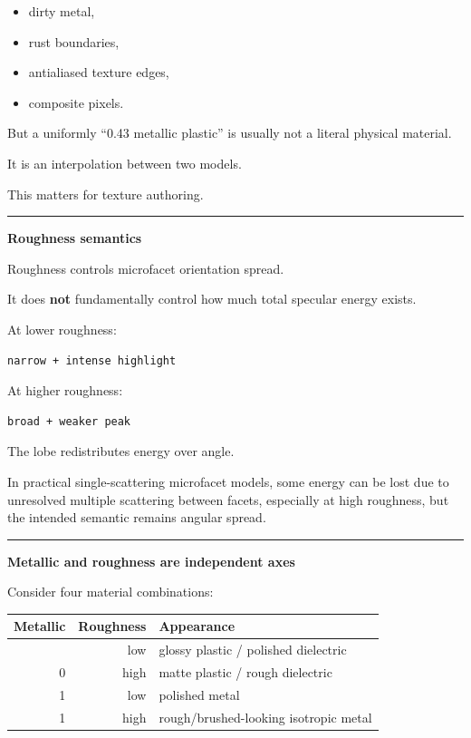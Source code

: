 \begin{itemize}
\tightlist
\item
  dirty metal,
\item
  rust boundaries,
\item
  antialiased texture edges,
\item
  composite pixels.
\end{itemize}

But a uniformly ``0.43 metallic plastic'' is usually not a literal physical material.

It is an interpolation between two models.

This matters for texture authoring.

\begin{center}\rule{0.5\linewidth}{0.5pt}\end{center}

\textbf{Roughness semantics}

Roughness controls microfacet orientation spread.

It does \textbf{not} fundamentally control how much total specular energy exists.

At lower roughness:

\begin{verbatim}
narrow + intense highlight
\end{verbatim}

At higher roughness:

\begin{verbatim}
broad + weaker peak
\end{verbatim}

The lobe redistributes energy over angle.

In practical single-scattering microfacet models, some energy can be lost due to unresolved multiple scattering between facets, especially at high roughness, but the intended semantic remains angular spread.

\begin{center}\rule{0.5\linewidth}{0.5pt}\end{center}

\textbf{Metallic and roughness are independent axes}

Consider four material combinations:

{\def\LTcaptype{none} %
\begin{longtable}[]{@{}rrl@{}}
\toprule\noalign{}
Metallic & Roughness & Appearance \\
\midrule\noalign{}
\endhead
\bottomrule\noalign{}
\endlastfoot
0 & low & glossy plastic / polished dielectric \\
0 & high & matte plastic / rough dielectric \\
1 & low & polished metal \\
1 & high & rough/brushed-looking isotropic metal \\
\end{longtable}
}

